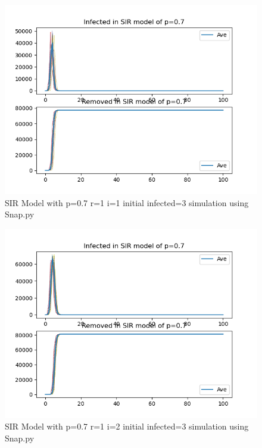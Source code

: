 \documentclass{subfile}
\begin{document}
  \begin{figure}
  \includegraphics[scale=0.8]{sirp07r1i1s3}
  \caption[SIR p=0.7,r=1,i=1,init infected=3]{SIR Model with p=0.7 r=1 i=1 initial infected=3 simulation using Snap.py}
  \end{figure}
  \begin{figure}
  \includegraphics[scale=0.8]{sirp07r1i2s3}
  \caption[SIR p=0.7,r=1,i=2,init infected=3]{SIR Model with p=0.7 r=1 i=2 initial infected=3 simulation using Snap.py}
  \end{figure}
\end{document}
